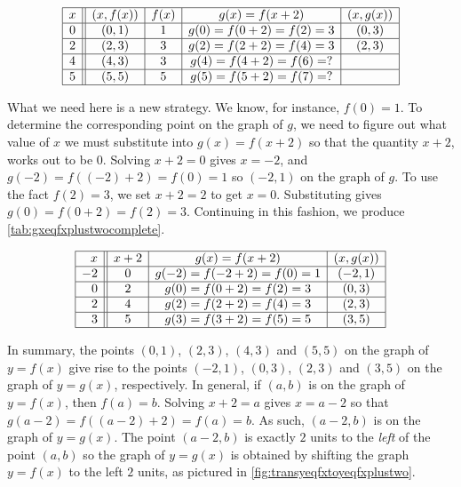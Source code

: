 \begin{table}

\[ \begin{array}{|c||c|c|c|c|}  

\hline

x & (x,f(x)) & f(x)& g(x)=f(x+2) & (x, g(x)) \\ \hline
0  & (0,1)& 1 & g(0) = f(0+2) = f(2) = 3   &(0, 3) \\  \hline
2 & (2,3) & 3 & g(2) = f(2+2) = f(4) = 3  &(2,3) \\  \hline
4 & (4,3) & 3 &  g(4) = f(4+2) = f(6) = ? &  \\  \hline
5 & (5,5) & 5 & g(5) = f(5+2) = f(7) = ?  &  \\  \hline

\end{array} \]

\caption{}
\label{tab:gxeqfxplustwo}
\end{table}

What we need here is a new strategy.  We know, for instance, $f(0) = 1$.  To determine the corresponding point on the graph of $g$, we need to figure out what value of $x$ we must substitute into $g(x) = f(x+2)$ so that the quantity $x+2$, works out to be $0$.  Solving $x+2=0$ gives $x=-2$, and $g(-2) = f((-2)+2) = f(0) = 1$ so  $(-2,1)$ on the graph of $g$.  To use the fact $f(2) = 3$, we set $x+2 = 2$ to get $x=0$. Substituting gives $g(0) = f(0+2) = f(2) = 3$. Continuing in this fashion, we produce \autoref{tab:gxeqfxplustwocomplete}.
 
\begin{table}

\[ \begin{array}{|r||c|c|c|}  

\hline

x & x+2 & g(x)=f(x+2) & (x, g(x)) \\ \hline
-2 & 0 & g(-2)=f(-2+2) = f(0) = 1   &(-2, 1) \\  \hline
0 &  2 &  g(0)=f(0+2) = f(2) = 3  &(0,3) \\  \hline
2 & 4  & g(2)=f(2+2) = f(4) = 3 &  (2,3)\\  \hline
3 & 5 & g(3)=f(3+2) = f(5) = 5  & (3,5) \\  \hline

\end{array} \]

\caption{}
\label{tab:gxeqfxplustwocomplete}
\end{table}

In summary, the points $(0,1)$, $(2,3)$, $(4,3)$ and $(5,5)$ on the graph of $y=f(x)$ give rise to the points  $(-2,1)$, $(0,3)$, $(2,3)$ and $(3,5)$ on the graph of $y=g(x)$, respectively.  In general, if $(a,b)$ is on the graph of $y=f(x)$, then $f(a) = b$.  Solving $x+2 = a$ gives $x = a-2$ so that $g(a-2) = f((a-2)+2) = f(a) = b$.  As such, $(a-2,b)$ is on the graph of $y=g(x)$. The point $(a-2,b)$ is exactly $2$ units to the \emph{left} of the point $(a,b)$ so the graph of $y=g(x)$ is obtained by shifting the graph $y=f(x)$ to the left $2$ units, as pictured in \autoref{fig:transyeqfxtoyeqfxplustwo}.

